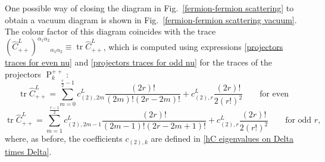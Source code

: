 \documentclass[a4paper]{article}
\newcommand{\hC}{\widehat{C}}
\renewcommand{\=}{\ =\ }
\DeclareMathOperator{\proj}{P}
\DeclareMathOperator{\tr}{tr}
\numberwithin{equation}{section}
\theoremstyle{remark}
\begin{document}
One possible way of closing the diagram in Fig.~\ref{fermion-fermion scattering} to obtain a vacuum diagram is shown in Fig.~\ref{fermion-fermion scattering vacuum}. The colour factor of this diagram coincides with the trace $(\hC_{++}^L)^{\alpha_1\alpha_2}{}_{\alpha_1\alpha_2} \equiv \tr \hC_{++}^L$, which is computed using expressions \eqref{projectors traces for even nu} and \eqref{projectors traces for odd nu} for the traces of the projectors $\proj^{++}_{k}$:
\begin{equation}
\tr \hC_{++}^L =\sum_{m=0}^{\frac{r}{2}-1} c_{(2),2m}^L \frac{(2r)!}{(2m)!(2r-2m)!} + c_{(2),r}^L \frac{(2r)!}{2(r!)^2} \qquad \text{for even }
\end{equation}
\begin{equation}
\tr \hC_{++}^L =\sum_{m=1}^{\frac{r-1}{2}} c_{(2),2m-1}^L \frac{(2r)!}{(2m-1)!(2r-2m+1)!} + c_{(2),r}^L \frac{(2r)!}{2(r!)^2} \qquad \text{for odd } r,
\end{equation}
where, as before, the coefficients $c_{(2),k}$ are defined in \eqref{hC eigenvalues on Delta times Delta}.
\end{document}
